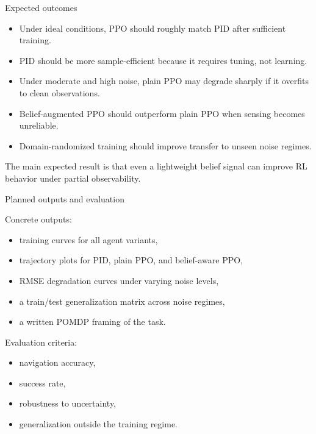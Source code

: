 \documentclass[11pt]{beamer}
\begin{document}

\begin{frame}{Expected outcomes}

\begin{itemize}
  \item Under ideal conditions, PPO should roughly match PID after sufficient training.
  \item PID should be more sample-efficient because it requires tuning, not learning.
  \item Under moderate and high noise, plain PPO may degrade sharply if it overfits to clean observations.
  \item Belief-augmented PPO should outperform plain PPO when sensing becomes unreliable.
  \item Domain-randomized training should improve transfer to unseen noise regimes.
\end{itemize}

\medskip
The main expected result is that even a lightweight belief signal can improve RL behavior under partial observability.
\end{frame}


\begin{frame}{Planned outputs and evaluation}

Concrete outputs:
\begin{itemize}
  \item training curves for all agent variants,
  \item trajectory plots for PID, plain PPO, and belief-aware PPO,
  \item RMSE degradation curves under varying noise levels,
  \item a train/test generalization matrix across noise regimes,
  \item a written POMDP framing of the task.
\end{itemize}

\medskip
Evaluation criteria:
\begin{itemize}
  \item navigation accuracy,
  \item success rate,
  \item robustness to uncertainty,
  \item generalization outside the training regime.
\end{itemize}
\end{frame}
\end{document}
